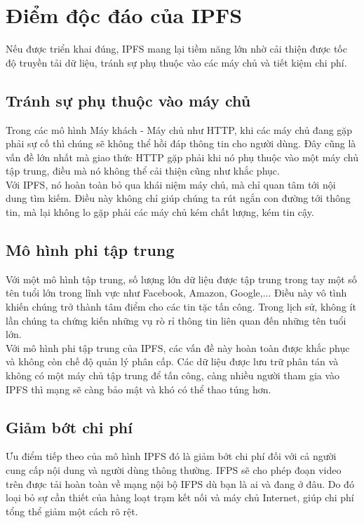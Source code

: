 \section{Điểm độc đáo của IPFS}

Nếu được triển khai đúng, IPFS mang lại tiềm năng lớn nhờ cải thiện được tốc độ truyền tải dữ liệu, tránh sự phụ thuộc vào các máy chủ và tiết kiệm chi phí.

\subsection{Tránh sự phụ thuộc vào máy chủ}

Trong các mô hình Máy khách - Máy chủ như HTTP, khi các máy chủ đang gặp phải sự cố thì chúng sẽ không thể hồi đáp thông tin cho người dùng. Đây cũng là vấn đề lớn nhất mà giao thức HTTP gặp phải khi nó phụ thuộc vào một máy chủ tập trung, điều mà nó không thể cải thiện cũng như khắc phục.\\

Với IPFS, nó hoàn toàn bỏ qua khái niệm máy chủ, mà chỉ quan tâm tới nội dung tìm kiếm. Điều này không chỉ giúp chúng ta rút ngắn con đường tới thông tin, mà lại không lo gặp phải các máy chủ kém chất lượng, kém tin cậy.

\subsection{Mô hình phi tập trung}

Với một mô hình tập trung, số lượng lớn dữ liệu được tập trung trong tay một số tên tuổi lớn trong lĩnh vực như Facebook, Amazon, Google,... Điều này vô tình khiến chúng trở thành tâm điểm cho các tin tặc tấn công. Trong lịch sử, không ít lần chúng ta chứng kiến những vụ rò rỉ thông tin liên quan đến những tên tuổi lớn.\\

Với mô hình phi tập trung của IPFS, các vấn đề này hoàn toàn được khắc phục và không còn chế độ quản lý phân cấp. Các dữ liệu được lưu trữ phân tán và không có một máy chủ tập trung để tấn công, càng nhiều người tham gia vào IPFS thì mạng sẽ càng bảo mật và khó có thể thao túng hơn.

\subsection{Giảm bớt chi phí}

Ưu điểm tiếp theo của mô hình IPFS đó là giảm bớt chi phí đối với cả người cung cấp nội dung và người dùng thông thường. IFPS sẽ cho phép đoạn video trên được tải hoàn toàn về mạng nội bộ IFPS dù bạn là ai và đang ở đâu. Do đó loại bỏ sự cần thiết của hàng loạt trạm kết nối và máy chủ Internet, giúp chi phí tổng thể giảm một cách rõ rệt.

